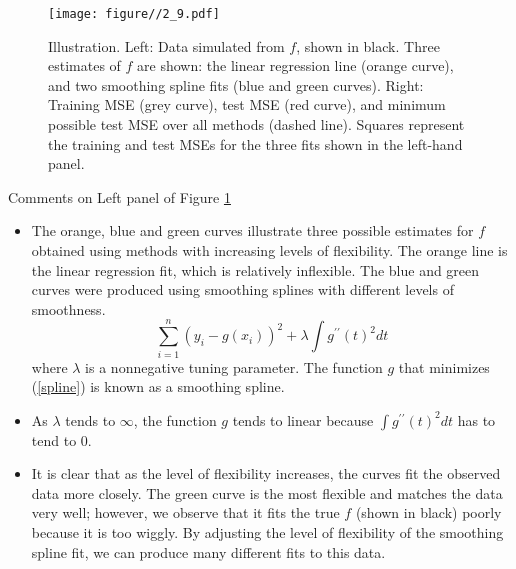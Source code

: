 \documentclass[10pt,a4paper]{beamer}
\begin{document}
\begin{frame}{}

\begin{figure}
  \centering
  \texttt{[image: figure//2\_9.pdf]}\\
  \caption{Illustration. Left: Data simulated from $f$, shown in black. Three estimates of
$f$ are shown: the linear regression line (orange curve), and two smoothing spline
fits (blue and green curves). Right: Training MSE (grey curve), test MSE (red
curve), and minimum possible test MSE over all methods (dashed line). Squares
represent the training and test MSEs for the three fits shown in the left-hand
panel.}\label{2_9}
\end{figure}


\end{frame}

\begin{frame}{Comments on Left panel of Figure \ref{2_9}}

\begin{itemize}
  \item The orange, blue and green curves illustrate three possible estimates for $f$ obtained using methods with increasing
levels of flexibility. The orange line is the linear regression fit, which is relatively inflexible. The blue and green curves were produced using smoothing
splines with different levels of smoothness.
\begin{equation}\label{spline}
  \sum^n_{i=1}(y_i - g(x_i))^2 + \lambda \int g^{\prime\prime}(t)^2 dt
\end{equation}
where $\lambda$ is a nonnegative tuning parameter. The function $g$ that minimizes (\ref{spline}) is known as a smoothing spline.
\item As $\lambda$ tends to $\infty$, the function $g$ tends to linear because $\int g^{\prime\prime}(t)^2 dt$ has to tend to 0.
  \item It is clear that as the level of flexibility increases, the curves fit the observed
data more closely. The green curve is the most flexible and matches the
data very well; however, we observe that it fits the true $f$ (shown in black)
poorly because it is too wiggly. By adjusting the level of flexibility of the
smoothing spline fit, we can produce many different fits to this data.
\end{itemize}

\end{frame}
\end{document}
